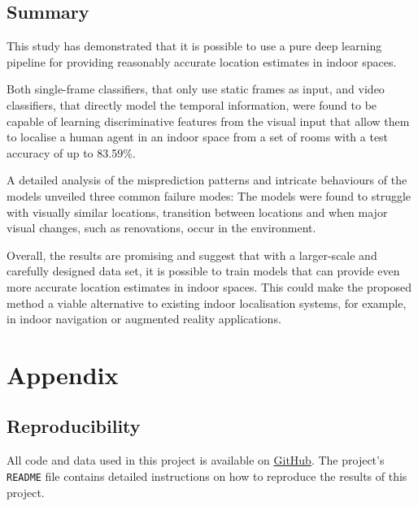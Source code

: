 \documentclass[a4paper]{article}
\begin{document}
\subsection{Summary} %
\label{sub:summary}

This study has demonstrated that it is possible to use a pure deep learning
pipeline for providing reasonably accurate location estimates in indoor spaces.

Both single-frame classifiers, that only use static frames as input, and video
classifiers, that directly model the temporal information, were found to be
capable of learning discriminative features from the visual input that allow
them to localise a human agent in an indoor space from a set of rooms with a
test accuracy of up to 83.59\%.

A detailed analysis of the misprediction patterns and intricate behaviours of
the models unveiled three common failure modes: The models were found to
struggle with visually similar locations, transition between locations  and when
major visual changes, such as renovations, occur in the environment. 

Overall, the results are promising and suggest that with a larger-scale and
carefully designed data set, it is possible to train models that can provide
even more accurate location estimates in indoor spaces. This could make the
proposed method a viable alternative to existing indoor localisation systems,
for example, in indoor navigation or augmented reality applications.

\newpage



\newpage
\section{Appendix} %
\label{sec:appendix}

\subsection{Reproducibility} %
\label{sub:reproducibility}

All code and data used in this project is available on
\href{https://github.com/mikasenghaas/bsc}{GitHub}. The project's
\texttt{README} file contains detailed instructions on how to reproduce the
results of this project.
\end{document}
